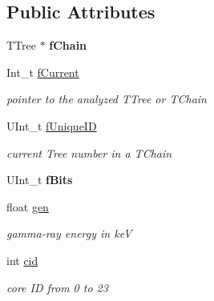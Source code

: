 \subsection*{Public Attributes}
\begin{DoxyCompactItemize}
\item 
\mbox{\label{classg__clx_a130d1bf27b8d3e663d2b27ade478ae0b}} 
T\+Tree $\ast$ {\bfseries f\+Chain}
\item 
\mbox{\label{classg__clx_a4ebe765901e5abf5d740a59edd2796d3}} 
Int\+\_\+t \hyperlink{classg__clx_a4ebe765901e5abf5d740a59edd2796d3}{f\+Current}
\begin{DoxyCompactList}\small\item\em pointer to the analyzed T\+Tree or T\+Chain \end{DoxyCompactList}\item 
\mbox{\label{classg__clx_abf3f260c2d2f9884a9f6b041f54ec94a}} 
U\+Int\+\_\+t \hyperlink{classg__clx_abf3f260c2d2f9884a9f6b041f54ec94a}{f\+Unique\+ID}
\begin{DoxyCompactList}\small\item\em current Tree number in a T\+Chain \end{DoxyCompactList}\item 
\mbox{\label{classg__clx_a7206bd09efca58552eea94544746280e}} 
U\+Int\+\_\+t {\bfseries f\+Bits}
\item 
\mbox{\label{classg__clx_afa1d8a83322f5f91c433b1747ffdc71b}} 
float \hyperlink{classg__clx_afa1d8a83322f5f91c433b1747ffdc71b}{gen}
\begin{DoxyCompactList}\small\item\em gamma-\/ray energy in keV \end{DoxyCompactList}\item 
\mbox{\label{classg__clx_a0cc2a584a4f5152751778ee68bcdb743}} 
int \hyperlink{classg__clx_a0cc2a584a4f5152751778ee68bcdb743}{cid}
\begin{DoxyCompactList}\small\item\em core ID from 0 to 23 \end{DoxyCompactList}\item 
\mbox{\label{classg__clx_a04f33012ec56804fca6978885732bc8f}} 

\end{DoxyCompactItemize}
